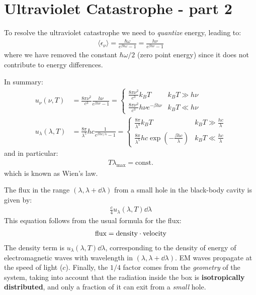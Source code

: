 \documentclass[../template.tex]{subfiles}
\begin{document}
\section{Ultraviolet Catastrophe - part 2}
To resolve the ultraviolet catastrophe we need to \textit{quantize} energy, leading to:
\begin{align*}
    \langle \epsilon_\nu \rangle = \frac{\hbar \omega}{e^{\beta \hbar \omega} - 1} = \frac{h \nu}{e^{\beta h \nu} - 1}  
\end{align*} 
where we have removed the constant $\hbar \omega/2$ (zero point energy) since it does not contribute to energy differences.

In summary:
\begin{align*}
    u_\nu(\nu, T) &= \frac{8 \pi \nu^2}{c^3} \frac{h \nu}{e^{\beta h \nu} - 1} = \begin{cases}
        \frac{8 \pi \nu^2}{c^3} k_B T & k_B T \gg h \nu\\
        \frac{8 \pi \nu^2}{c^3} h \nu e^{- \beta h \nu} & k_B T \ll h \nu  
    \end{cases}  \\
    u_\lambda(\lambda,T) &= \frac{8 \pi}{\lambda^5} h c \frac{1}{e^{\beta h c/\lambda} - 1} = \begin{cases}
        \frac{8 \pi}{\lambda^4} k_B T & k_B T \gg \frac{hc}{\lambda} \\
        \frac{8 \pi}{\lambda^5} h c \exp\left(-\frac{\beta h c}{\lambda} \right) & k_B T \ll \frac{hc}{\lambda} 
    \end{cases}  
\end{align*}
and in particular:
\begin{align*}
    T \lambda_{\mathrm{max}} = \text{const.}
\end{align*}
which is known as Wien's law.

\medskip

The flux in the range $(\lambda, \lambda + \dd{\lambda})$ from a small hole in the black-body cavity is given by:
\begin{align*}
    \frac{c}{4} u_\lambda (\lambda, T) \dd{\lambda}
\end{align*}
This equation follows from the usual formula for the flux:
\begin{align*}
    \rm{flux} = \rm{density} \cdot \rm{velocity}
\end{align*}
The density term is $u_\lambda(\lambda, T)\dd{\lambda}$, corresponding to the density of energy of electromagnetic waves with wavelength in $(\lambda, \lambda+\dd{\lambda})$. EM waves propagate at the speed of light ($c$). Finally, the $1/4$ factor comes from the \textit{geometry} of the system, taking into account that the radiation inside the box is \textbf{isotropically distributed}, and only a fraction of it can exit from a \textit{small} hole. 
\end{document}
